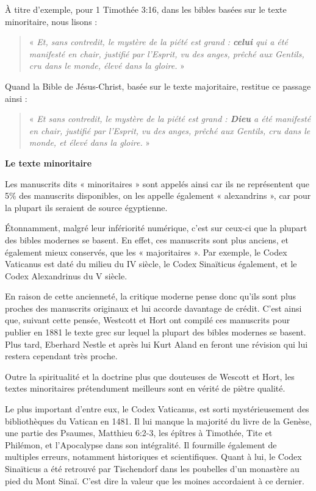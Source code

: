 \begin{small}
À titre d'exemple, pour 1 Timothée 3:16, dans les bibles basées sur le texte minoritaire, nous lisons :
\begin{quote}
« \emph{Et, sans contredit, le mystère de la piété est grand : \textbf{celui} qui a été manifesté en chair, justifié par l'Esprit, vu des anges, prêché aux Gentils, cru dans le monde, élevé dans la gloire.} »
\end{quote}

Quand la Bible de Jésus-Christ, basée sur le texte majoritaire, restitue ce passage ainsi :
\begin{quote}
« \emph{Et sans contredit, le mystère de la piété est grand : \textbf{Dieu} a été manifesté en chair, justifié par l'Esprit, vu des anges, prêché aux Gentils, cru dans le monde, et élevé dans la gloire.} »\newline
\end{quote}

\textbf{Le texte minoritaire}\bigskip

Les manuscrits dits « minoritaires » sont appelés ainsi car ils ne représentent que 5\% des manuscrits disponibles, on les appelle également « alexandrins », car pour la plupart ils seraient de source égyptienne.\bigskip

Étonnamment, malgré leur infériorité numérique, c'est sur ceux-ci que la plupart des bibles modernes se basent. En effet, ces manuscrits sont plus anciens, et également mieux conservés, que les « majoritaires ». Par exemple, le Codex Vaticanus est daté du milieu du IV siècle, le Codex Sinaïticus également, et le Codex Alexandrinus du V siècle.\bigskip

En raison de cette ancienneté, la critique moderne pense donc qu'ils sont plus proches des manuscrits originaux et lui accorde davantage de crédit. C'est ainsi que, suivant cette pensée, Westcott et Hort ont compilé ces manuscrits pour publier en 1881 le texte grec sur lequel la plupart des bibles modernes se basent. Plus tard, Eberhard Nestle et après lui Kurt Aland en feront une révision qui lui restera cependant très proche.\bigskip

Outre la spiritualité et la doctrine plus que douteuses de Wescott et Hort, les textes minoritaires prétendument meilleurs sont en vérité de piètre qualité.\bigskip

Le plus important d'entre eux, le Codex Vaticanus, est sorti mystérieusement des bibliothèques du Vatican en 1481. Il lui manque la majorité du livre de la Genèse, une partie des Psaumes, Matthieu 6:2-3, les épîtres à Timothée, Tite et Philémon, et l'Apocalypse dans son intégralité. Il fourmille également de multiples erreurs, notamment historiques et scientifiques. Quant à lui, le Codex Sinaïticus a été retrouvé par Tischendorf dans les poubelles d'un monastère au pied du Mont Sinaï. C'est dire la valeur que les moines accordaient à ce dernier.\bigskip


\end{small}
